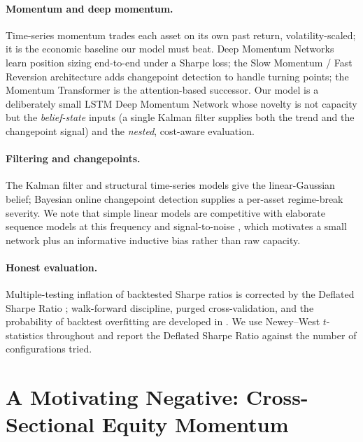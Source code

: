 \documentclass[11pt,a4paper]{article}
\theoremstyle{definition}
\begin{document}
\paragraph{Momentum and deep momentum.} Time-series momentum \cite{moskowitz2012} trades each asset
on its own past return, volatility-scaled; it is the economic baseline our model must beat. Deep
Momentum Networks \cite{lim2019} learn position sizing end-to-end under a Sharpe loss; the Slow
Momentum / Fast Reversion architecture \cite{wood2021} adds changepoint detection to handle
turning points; the Momentum Transformer \cite{wood2021mt} is the attention-based successor. Our
model is a deliberately small LSTM Deep Momentum Network whose novelty is not capacity but the
\emph{belief-state} inputs (a single Kalman filter supplies both the trend and the changepoint
signal) and the \emph{nested}, cost-aware evaluation.

\paragraph{Filtering and changepoints.} The Kalman filter \cite{kalman1960} and structural
time-series models give the linear-Gaussian belief; Bayesian online changepoint detection
\cite{adams2007} supplies a per-asset regime-break severity. We note that simple linear models are
competitive with elaborate sequence models at this frequency and signal-to-noise
\cite{zeng2023}, which motivates a small network plus an informative inductive bias rather than raw
capacity.

\paragraph{Honest evaluation.} Multiple-testing inflation of backtested Sharpe ratios is corrected
by the Deflated Sharpe Ratio \cite{bailey2014}; walk-forward discipline, purged cross-validation,
and the probability of backtest overfitting are developed in \cite{lopezdeprado2018}. We use
Newey--West $t$-statistics throughout and report the Deflated Sharpe Ratio against the number of
configurations tried.

\section{A Motivating Negative: Cross-Sectional Equity Momentum}
\label{sec:negative}
\end{document}
